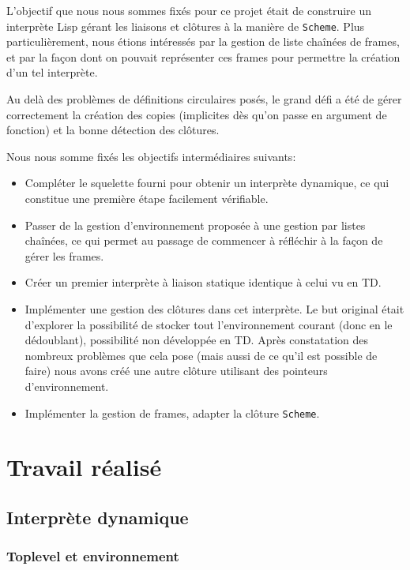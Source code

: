 \documentclass[a4paper,11pt]{article}
\begin{document}
L'objectif que nous nous sommes fixés pour ce projet était de construire un
interprète Lisp gérant les liaisons et clôtures à la manière de \texttt{Scheme}. Plus
particulièrement, nous étions intéressés par la gestion de liste chaînées de
frames, et par la façon dont on pouvait représenter ces frames pour permettre la
création d'un tel interprète.

Au delà des problèmes de définitions circulaires posés, le grand défi a été de
gérer correctement la création des copies (implicites dès qu'on passe en
argument de fonction) et la bonne détection des clôtures.

Nous nous somme fixés les objectifs intermédiaires suivants:
\begin{itemize}
\item Compléter le squelette fourni pour obtenir un interprète dynamique, ce qui
  constitue une première étape facilement vérifiable.
\item Passer de la gestion d'environnement proposée à une gestion par listes
  chaînées, ce qui permet au passage de commencer à réfléchir à la façon de
  gérer les frames.
\item Créer un premier interprète à liaison statique identique à celui vu en TD.
\item Implémenter une gestion des clôtures dans cet interprète. Le but original
  était d'explorer la possibilité de stocker tout l'environnement courant (donc
  en le dédoublant), possibilité non développée en TD. Après constatation des
  nombreux problèmes que cela pose (mais aussi de ce qu'il est possible de
  faire) nous avons créé une autre clôture utilisant des pointeurs
  d'environnement.
\item Implémenter la gestion de frames, adapter la clôture \texttt{Scheme}.
\end{itemize}


\section{Travail réalisé}

\subsection{Interprète dynamique}

\subsubsection{Toplevel et environnement}
\end{document}
